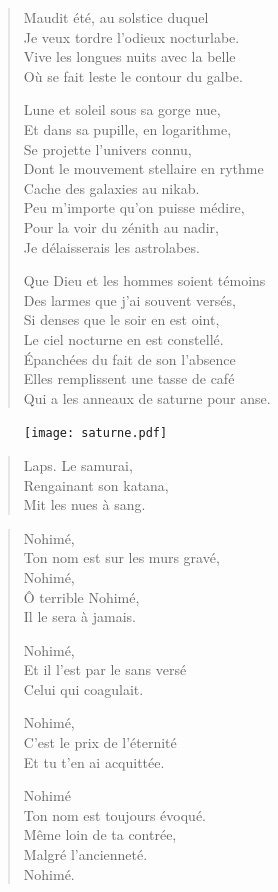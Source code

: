 \begin{verse}
Maudit été, au solstice duquel\\
Je veux tordre l’odieux nocturlabe.\\
Vive les longues nuits avec la belle\\
Où se fait leste le contour du galbe. 

Lune et soleil sous sa gorge nue,\\
Et dans sa pupille, en logarithme,\\
Se projette l’univers connu,\\
Dont le mouvement stellaire en rythme\\
Cache des galaxies au nikab.\\
Peu m’importe qu’on puisse médire,\\
Pour la voir du zénith au nadir,\\
Je délaisserais les astrolabes.

Que Dieu et les hommes soient témoins\\
Des larmes  que j’ai souvent versés,\\
Si denses que le soir en est oint,\\
Le ciel nocturne en est constellé.\\
Épanchées du fait de son l’absence\\
Elles remplissent une tasse de café\\
Qui a les anneaux de saturne pour anse.
\end{verse}

\begin{figure}[h]
\centering
\texttt{[image: saturne.pdf]}
\captionsetup{labelformat=empty}
\caption[Idéotexte de ]{}
\end{figure}


\begin{verse}
Laps. Le samurai,\\
Rengainant son katana,\\
Mit les nues à sang.
\end{verse}

\begin{verse}
Nohimé,\\
Ton nom est sur les murs gravé,\\
Nohimé,\\
Ô terrible Nohimé,\\
Il le sera à jamais.

Nohimé,\\
Et il l’est par le sans versé\\
Celui qui coagulait.

Nohimé,\\
C’est le prix de l’éternité\\
Et tu t’en ai acquittée.

Nohimé\\
Ton nom est toujours évoqué.\\
Même loin de ta contrée,\\
Malgré l’ancienneté.\\
Nohimé.
\end{verse}

